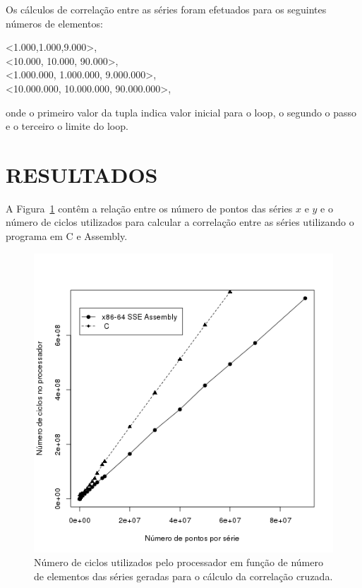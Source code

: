\documentclass[a4paper]{article}
\begin{document}
Os cálculos de correlação entre as séries foram efetuados para os
seguintes números de elementos:

\begin{center}
\begin{tt}
	<1.000,1.000,9.000>, \\
	<10.000, 10.000, 90.000>, \\
	<1.000.000, 1.000.000, 9.000.000>, \\
	<10.000.000, 10.000.000, 90.000.000>,\\
\end{tt}
\end{center}

\noindent onde o primeiro valor da tupla indica valor inicial para o
loop, o segundo o passo e o terceiro o limite do loop.

\section*{RESULTADOS}

A Figura~\ref{fig:c-versus-asm} contêm a relação entre os número de
pontos das séries $x$ e $y$ e o número de ciclos utilizados para calcular
a correlação entre as séries utilizando o programa em C e Assembly.

\begin{figure}[h]
  \centering
  \includegraphics[scale=.525]{xcorr-bench.png}
  \caption{Número de ciclos utilizados pelo processador em função de
    número de elementos das séries geradas para o cálculo da
    correlação cruzada.}
  \label{fig:c-versus-asm}
\end{figure}
\end{document}
